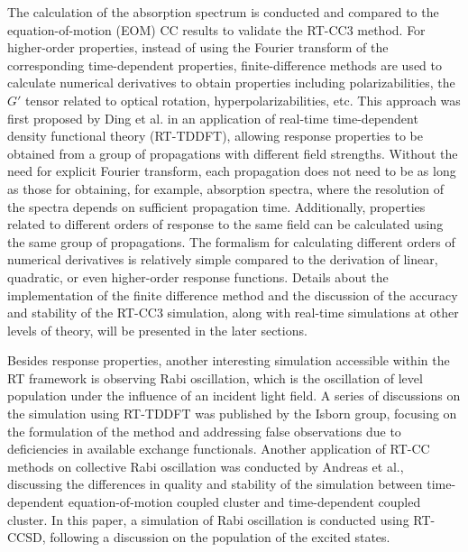 The calculation of the absorption spectrum is conducted and compared to the equation-of-motion (EOM) CC results to validate the RT-CC3 method. For higher-order properties, instead of using the Fourier transform of the corresponding time-dependent properties, finite-difference methods\cite{Perrone1975} are used to calculate numerical derivatives to obtain properties including polarizabilities, the $G'$ tensor related to optical rotation, hyperpolarizabilities, etc. This approach was first proposed by Ding et al. in an application of real-time time-dependent density functional theory (RT-TDDFT), allowing response properties to be obtained from a group of propagations with different field strengths.\cite{Ding2013} Without the need for explicit Fourier transform, each propagation does not need to be as long as those for obtaining, for example, absorption spectra, where the resolution of the spectra depends on sufficient propagation time. Additionally, properties related to different orders of response to the same field can be calculated using the same group of propagations. The formalism for calculating different orders of numerical derivatives is relatively simple compared to the derivation of linear, quadratic, or even higher-order response functions. Details about the implementation of the finite difference method and the discussion of the accuracy and stability of the RT-CC3 simulation, along with real-time simulations at other levels of theory, will be presented in the later sections.

Besides response properties, another interesting simulation accessible within the RT framework is observing Rabi oscillation,\cite{Knorr1994} which is the oscillation of level population under the influence of an incident light field. A series of discussions on the simulation using RT-TDDFT was published by the Isborn group, focusing on the formulation of the method and addressing false observations due to deficiencies in available exchange functionals.\cite{Habenicht2014, Provorse2015, Provorse2016, Ranka2023} Another application of RT-CC methods on collective Rabi oscillation was conducted by Andreas et al., discussing the differences in quality and stability of the simulation between time-dependent equation-of-motion coupled cluster and time-dependent coupled cluster.\cite{Skeidsvoll2023} In this paper, a simulation of Rabi oscillation is conducted using RT-CCSD, following a discussion on the population of the excited states.



